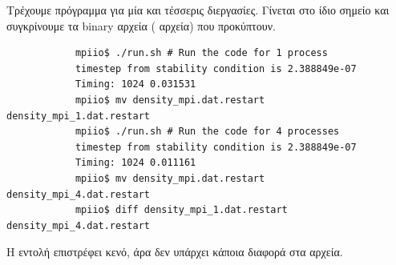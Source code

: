 \documentclass[11pt]{scrartcl} %
\begin{document}
        Τρέχουμε πρόγραμμα για μία και τέσσερις διεργασίες.
        Γίνεται  στο ίδιο σημείο και συγκρίνουμε τα binary αρχεία ( αρχεία) που προκύπτουν.

        \begin{verbatim}
            mpiio$ ./run.sh # Run the code for 1 process
            timestep from stability condition is 2.388849e-07
            Timing: 1024 0.031531
            mpiio$ mv density_mpi.dat.restart density_mpi_1.dat.restart
            mpiio$ ./run.sh # Run the code for 4 processes
            timestep from stability condition is 2.388849e-07
            Timing: 1024 0.011161
            mpiio$ mv density_mpi.dat.restart density_mpi_4.dat.restart
            mpiio$ diff density_mpi_1.dat.restart density_mpi_4.dat.restart
        \end{verbatim}
        
        Η εντολή  επιστρέφει κενό, άρα δεν υπάρχει κάποια διαφορά στα αρχεία.


    
\end{document}

